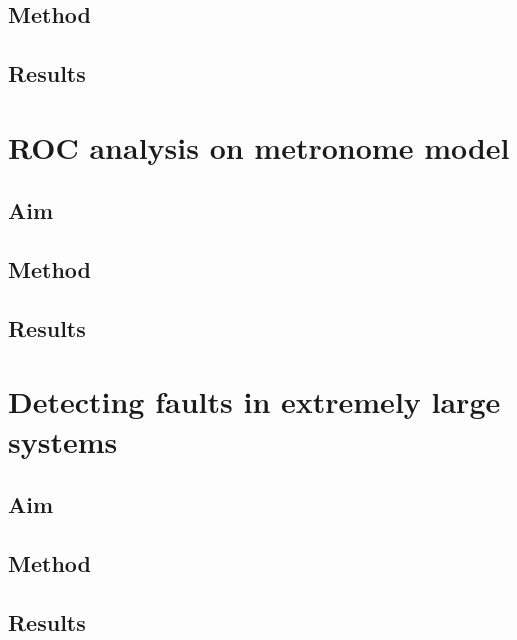 \subsection{Method}
\subsection{Results}

\section{ROC analysis on metronome model}
\subsection{Aim}
\subsection{Method}
\subsection{Results}

\section{Detecting faults in extremely large systems}
\subsection{Aim}
\subsection{Method}
\subsection{Results}

